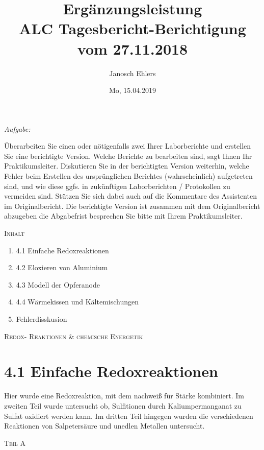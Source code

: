\documentclass[A4paper, 11p]{article}
\begin{document}
\title{Ergänzungsleistung\\ALC Tagesbericht-Berichtigung\\ vom 27.11.2018}
\author{Janosch Ehlers}
\date{Mo, 15.04.2019}
\maketitle

\begin{flushleft}
{\Large\textit{Aufgabe:}}
\end{flushleft}
Überarbeiten Sie einen oder nötigenfalls zwei Ihrer Laborberichte und erstellen Sie eine berichtigte Version. Welche Berichte zu bearbeiten sind, sagt Ihnen Ihr Praktikumsleiter. Diskutieren Sie in der berichtigten Version weiterhin, welche Fehler beim Erstellen des ursprünglichen Berichtes (wahrscheinlich) aufgetreten sind, und wie diese ggfs. in zukünftigen Laborberichten / Protokollen zu vermeiden sind. Stützen Sie sich dabei auch auf die Kommentare des Assistenten im Originalbericht. Die berichtigte Version ist zusammen mit dem Originalbericht abzugeben die Abgabefrist besprechen Sie bitte mit Ihrem Praktikumsleiter.\\

\begin{center}
\textsc{Inhalt}\\
\end{center}

\begin{enumerate}
\item 4.1 Einfache Redoxreaktionen
\item 4.2 Eloxieren von Aluminium
\item 4.3 Modell der Opferanode
\item 4.4 Wärmekissen und Kältemischungen
\item Fehlerdisskusion
\end{enumerate}

\newpage

\begin{center}
	\textsc{Redox- Reaktionen \& chemische Energetik}
\end{center}

\section{4.1 Einfache Redoxreaktionen}
Hier wurde eine Redoxreaktion, mit dem nachweiß für Stärke kombiniert. Im zweiten Teil wurde untersucht ob, Sulfitionen durch Kaliumpermanganat zu Sulfat oxidiert werden kann. Im dritten Teil hingegen wurden die verschiedenen Reaktionen von Salpetersäure und unedlen Metallen untersucht.
\begin{center} 
\textsc{Teil A} 
\end{center}
\end{document}
